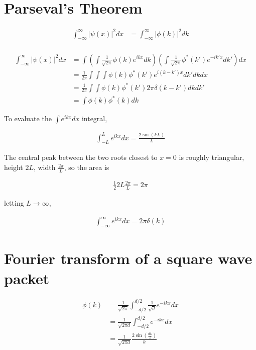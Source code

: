 \documentclass{article}
\title{}
\date{}
\newcommand{\<}{\langle}
\renewcommand{\>}{\rangle}
\begin{document}
\maketitle

\section{Parseval's Theorem}

\begin{align*}
\int_{-\infty}^{\infty} |\psi(x)|^2 dx &= \int_{-\infty}^{\infty} |\phi(k)|^2 dk \\
\end{align*}

\begin{align*}
\int_{-\infty}^{\infty} |\psi(x)|^2 dx &= \int \left(\int \frac{1}{\sqrt{2\pi}} \phi(k) e^{ikx} dk \right) \left( \int \frac{1}{\sqrt{2\pi}}\phi^*(k') e^{-ik'x} dk' \right) dx \\
&= \frac{1}{2\pi} \int\int\int \phi(k) \phi^*(k') e^{i(k-k')x} dk' dk dx \\
&= \frac{1}{2\pi} \int\int \phi(k) \phi^*(k') 2\pi\delta(k-k') dk dk' \\
&= \int \phi(k) \phi^*(k) dk
\end{align*}

To evaluate the $\int e^{ikx} dx$ integral,

\begin{align*}
\int_{-L}^L e^{ikx} dx = \frac{2\sin(kL)}{L}
\end{align*}

The central peak between the two roots closest to $x=0$ is roughly triangular, height $2L$, width $\frac{2\pi}{L}$, so the area is

\begin{align*}
\frac{1}{2} 2L \frac{2\pi}{L} = 2\pi
\end{align*}

letting $L \rightarrow \infty$,

\begin{align*}
\int_{-\infty}^\infty e^{ikx} dx = 2\pi\delta(k)
\end{align*}

\section{Fourier transform of a square wave packet}

\begin{align*}
\phi(k) &= \frac{1}{\sqrt{2\pi}} \int_{-d/2}^{d/2} \frac{1}{\sqrt d} e^{-ikx} dx \\
&= \frac{1}{\sqrt{2\pi d}} \int_{-d/2}^{d/2} e^{-ikx} dx \\
&= \frac{1}{\sqrt{2\pi d}} \frac{2\sin(\frac{dk}{2})}{k}
\end{align*}
\end{document}
